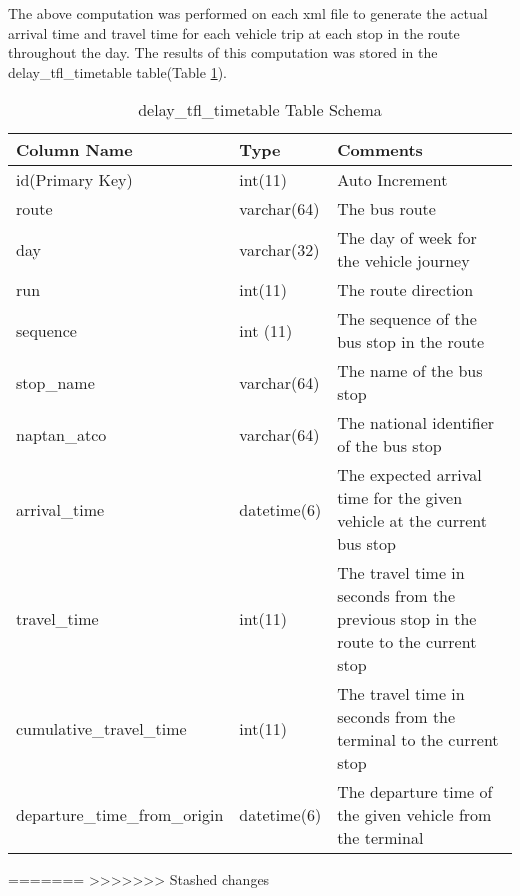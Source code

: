 The above computation was performed on each xml file to generate the actual arrival time and travel time for each vehicle trip at each stop in the route throughout the day. The results of this computation was stored in the delay\_tfl\_timetable table(Table \ref{table:delay_tfl_timetable}).

\begin{table}
\centering
\begin{tabular}{@{}llp{6cm}@{}} \toprule
Column Name & Type & Comments\\ \midrule
id(Primary Key) & int(11)  & Auto Increment\\ [0.4cm]
route & varchar(64) & The bus route \\ [0.4cm]
day & varchar(32) & The day of week for the vehicle journey \\ [0.4cm]
run & int(11) & The route direction \\ [0.4cm]
sequence & int (11) & The sequence of the bus stop in the route \\ [0.4cm]
stop\_name & varchar(64) & The name of the bus stop \\ [0.4cm]
naptan\_atco & varchar(64) & The national identifier of the bus stop \\ [0.4cm]
arrival\_time & datetime(6) & The expected arrival time for the given vehicle at the current bus stop \\ [0.4cm]
travel\_time & int(11) & The travel time in seconds from the previous stop in the route to the current stop \\ [0.4cm]
cumulative\_travel\_time & int(11) & The travel time  in seconds from the terminal to the current stop \\ [0.4cm]
departure\_time\_from\_origin & datetime(6) & The departure time of the given vehicle from the terminal \\
\bottomrule
\end{tabular}
\caption{delay\_tfl\_timetable Table Schema}
\label{table:delay_tfl_timetable}
\end{table}
=======
>>>>>>> Stashed changes

